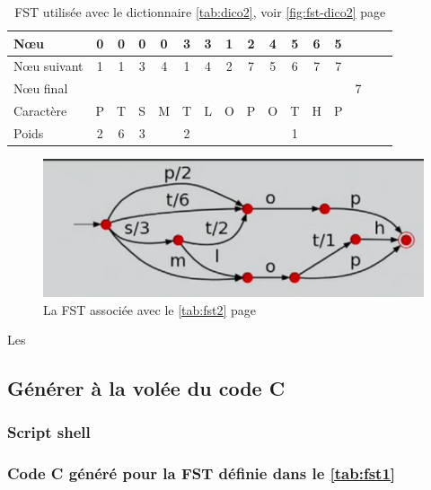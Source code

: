 \begin{table}[ht]
    \centering
    \begin{tabular}{|l||c|c|c|c|c|c|c|c|c|c|c|c|c|c|c|}
        \hline
        N\oe u & 0 & 0 & 0 & 0 & 3 & 3 & 1 & 2 & 4 & 5 & 6 & 5 &\\ \hline
        N\oe u suivant & 1 & 1 & 3 & 4 & 1 & 4 & 2 & 7 & 5 & 6 & 7 & 7 &\\ \hline
        N\oe u final &&&&&&&&&&&&& 7 \\ \hline
        Caractère & P & T & S & M& T & L & O & P & O & T & H & P & \\ \hline
        Poids & 2 & 6 & 3 &  & 2 & & & & & 1 &&& \\ \hline
    \end{tabular}
    \caption{FST utilisée avec le dictionnaire \autoref{tab:dico2}, voir \autoref{fig:fst-dico2} page \pageref{fig:fst-dico2}}
    \label{tab:fst2}
\end{table}

\begin{figure}[!htb]
    \centering
    \includegraphics[scale=0.5]{../c_asm/2.png}
    \caption{La FST associée avec le \autoref{tab:fst2} page \pageref{tab:fst2}}
    \label{fig:fst-dico2}
\end{figure}
Les
\clearpage
\subsection{Générer à la volée du code C}
\label{sec:annexe:shell:c}
\subsubsection{Script shell}



\clearpage
\subsubsection{Code C généré pour la FST définie dans le \autoref{tab:fst1}}

